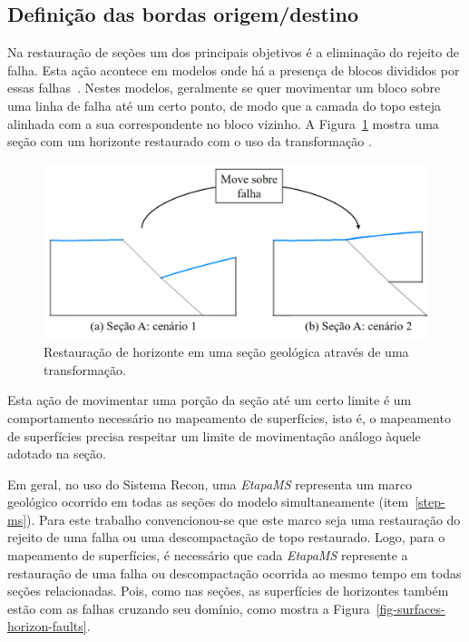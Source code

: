 \subsection{Definição das bordas origem/destino}

Na restauração de seções um dos principais objetivos é a eliminação do rejeito de falha. Esta ação acontece em modelos onde há a presença de blocos divididos por essas falhas~\cite{Santi}. Nestes modelos, geralmente se quer movimentar um bloco sobre uma linha de falha até um certo ponto, de modo que a camada do topo esteja alinhada com a sua correspondente no bloco vizinho. A Figura~\ref{fig-section-horizon-restored} mostra uma seção com um horizonte restaurado com o uso da transformação .

\begin{figure} [H]
  \begin{center}
    \includegraphics[width=350pt]{images/fig-section-horizon-restored}
    \caption{Restauração de horizonte em uma seção geológica através de uma transformação.}\label{fig-section-horizon-restored}
  \end{center}
\end{figure}

Esta ação de movimentar uma porção da seção até um certo limite é um comportamento necessário no mapeamento de superfícies, isto é, o mapeamento de superfícies precisa respeitar um limite de movimentação análogo àquele adotado na seção.

Em geral, no uso do Sistema Recon, uma \textit{EtapaMS} representa um marco geológico ocorrido em todas as seções do modelo simultaneamente (item~\ref{step-ms}). Para este trabalho convencionou-se que este marco seja uma restauração do rejeito de uma falha ou uma descompactação de topo restaurado. Logo, para o mapeamento de superfícies, é necessário que cada \textit{EtapaMS} represente a restauração de uma falha ou descompactação ocorrida ao mesmo tempo em todas seções relacionadas. Pois, como nas seções, as superfícies de horizontes também estão com as falhas cruzando seu domínio, como mostra a Figura~\ref{fig-surfaces-horizon-faults}.

